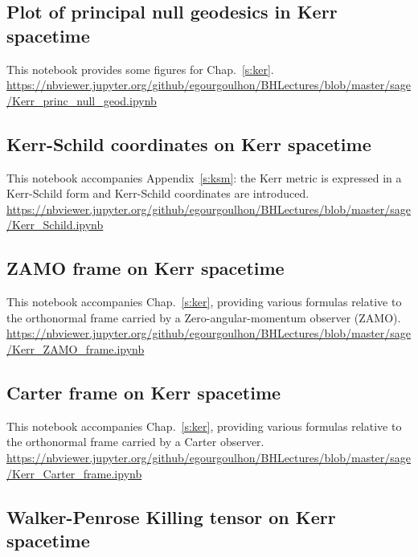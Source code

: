 \subsection{Plot of principal null geodesics in Kerr spacetime} \label{s:sam:Kerr_princ_null_geod}

This notebook provides some figures for Chap.~\ref{s:ker}.\\[1ex]
{\footnotesize
\url{https://nbviewer.jupyter.org/github/egourgoulhon/BHLectures/blob/master/sage/Kerr_princ_null_geod.ipynb}
}


\subsection{Kerr-Schild coordinates on Kerr spacetime} \label{s:sam:Kerr_Schild}

This notebook accompanies Appendix~\ref{s:ksm}: the Kerr metric is expressed in
a Kerr-Schild form and Kerr-Schild coordinates are introduced.\\[1ex]
{\footnotesize
\url{https://nbviewer.jupyter.org/github/egourgoulhon/BHLectures/blob/master/sage/Kerr_Schild.ipynb}
}

\subsection{ZAMO frame on Kerr spacetime} \label{s:sam:Kerr_ZAMO_frame}

This notebook accompanies Chap.~\ref{s:ker}, providing various formulas relative to
the orthonormal frame carried by a Zero-angular-momentum observer (ZAMO).\\[1ex]
{\footnotesize
\url{https://nbviewer.jupyter.org/github/egourgoulhon/BHLectures/blob/master/sage/Kerr_ZAMO_frame.ipynb}
}

\subsection{Carter frame on Kerr spacetime} \label{s:sam:Kerr_Carter_frame}

This notebook accompanies Chap.~\ref{s:ker}, providing various formulas relative to
the orthonormal frame carried by a Carter observer.\\[1ex]
{\footnotesize
\url{https://nbviewer.jupyter.org/github/egourgoulhon/BHLectures/blob/master/sage/Kerr_Carter_frame.ipynb}
}


\subsection{Walker-Penrose Killing tensor on Kerr spacetime} \label{s:sam:Kerr_Killing_tensor}

